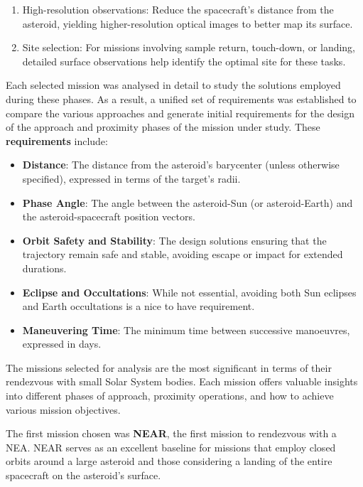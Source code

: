 \documentclass{Configuration_gigi/PoliMi3i_thesis}
\begin{document}
\begin{itemize}
\begin{itemize}
\begin{enumerate}
            \item High-resolution observations: Reduce the spacecraft’s distance from the asteroid, yielding higher-resolution optical images to better map its surface.
            \item Site selection: For missions involving sample return, touch-down, or landing, detailed surface observations help identify the optimal site for these tasks.
        \end{enumerate}
    \end{itemize}
\end{itemize}

Each selected mission was analysed in detail to study the solutions employed during these phases. As a result, a unified set of requirements was established to compare the various approaches and generate initial requirements for the design of the approach and proximity phases of the mission under study. These \textbf{requirements} include:

\begin{itemize}
    \item \textbf{Distance}: The distance from the asteroid's barycenter (unless otherwise specified), expressed in terms of the target's radii.
    \item \textbf{Phase Angle}: The angle between the asteroid-Sun (or asteroid-Earth) and the asteroid-spacecraft position vectors.
    \item \textbf{Orbit Safety and Stability}: The design solutions ensuring that the trajectory remain safe and stable, avoiding escape or impact for extended durations.
    \item \textbf{Eclipse and Occultations}: While not essential, avoiding both Sun eclipses and Earth occultations is a nice to have requirement.
    \item \textbf{Maneuvering Time}: The minimum time between successive manoeuvres, expressed in days.
\end{itemize}

The missions selected for analysis are the most significant in terms of their rendezvous with small Solar System bodies. Each mission offers valuable insights into different phases of approach, proximity operations, and how to achieve various mission objectives.

The first mission chosen was \textbf{NEAR}, the first mission to rendezvous with a NEA. NEAR serves as an excellent baseline for missions that employ closed orbits around a large asteroid and those considering a landing of the entire spacecraft on the asteroid's surface.
\end{document}
